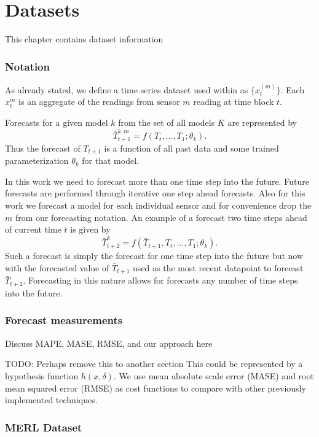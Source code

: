 \chapter{Datasets}
This chapter contains dataset information

\subsection{Notation}
As already stated, we define a time series dataset used within as  $\{x_{t}^{(m)}\}$.  Each $x_{t}^{m}$ is an aggregate of the readings from sensor $m$ reading at time block $t$. 

Forecasts for a given model $k$ from the set of all models $K$ are represented by 
\begin{equation}
\bar{T}_{t + 1}^{k, m} = f(T_{t}, ..., T_{1}; \theta_{k}).
\end{equation}
\noindent
Thus the forecast of $T_{t + 1}$ is a function of all past data and some trained parameterization $\theta_{k}$ for that model. 

In this work we need to forecast more than one time step into the future.  Future forecasts are performed through iterative one step ahead forecasts.  Also for this work we forecast a model for each individual sensor and for convenience drop the $m$ from our forecasting notation.  An example of a forecast two time steps ahead of current time $t$ is given by 
\begin{equation}
\bar{T}_{t + 2}^{k} = f(\bar{T}_{t + 1}, T_{t}, ..., T_{1}; \theta_{k}).
\end{equation}
\noindent
Such a forecast is simply the forecast for one time step into the future but now with the forecasted value of $\bar{T}_{t + 1}$ used as the most recent datapoint to forecast $\bar{T}_{t + 2}$.  Forecasting in this nature allows for forecasts any number of time steps into the future. 

\subsection{Forecast measurements}
Discuss MAPE, MASE, RMSE, and our approach here

TODO: Perhaps remove this to another section
This could be represented by a hypothesis function $h(x, \delta)$.  We use mean absolute scale error (MASE) \cite{Hyndman2006} and root mean squared error (RMSE) as cost functions to compare with other previously implemented techniques.

\subsection{MERL Dataset} 

